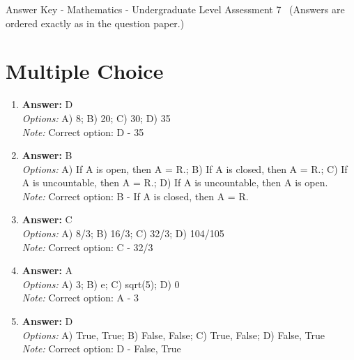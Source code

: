 \documentclass[12pt]{article}
\begin{document}
\begin{center}
Answer Key - Mathematics - Undergraduate Level Assessment 7 \
\small (Answers are ordered exactly as in the question paper.)
\end{center}

\section*{Multiple Choice}
\begin{enumerate}[label=\arabic*.]
\item \textbf{Answer:} D
\\ \textit{Options:} A) 8; B) 20; C) 30; D) 35
\\ \textit{Note:} Correct option: D - 35
\item \textbf{Answer:} B
\\ \textit{Options:} A) If A is open, then A = R.; B) If A is closed, then A = R.; C) If A is uncountable, then A = R.; D) If A is uncountable, then A is open.
\\ \textit{Note:} Correct option: B - If A is closed, then A = R.
\item \textbf{Answer:} C
\\ \textit{Options:} A) 8/3; B) 16/3; C) 32/3; D) 104/105
\\ \textit{Note:} Correct option: C - 32/3
\item \textbf{Answer:} A
\\ \textit{Options:} A) 3; B) e; C) sqrt(5); D) 0
\\ \textit{Note:} Correct option: A - 3
\item \textbf{Answer:} D
\\ \textit{Options:} A) True, True; B) False, False; C) True, False; D) False, True
\\ \textit{Note:} Correct option: D - False, True
\end{enumerate}
\end{document}
